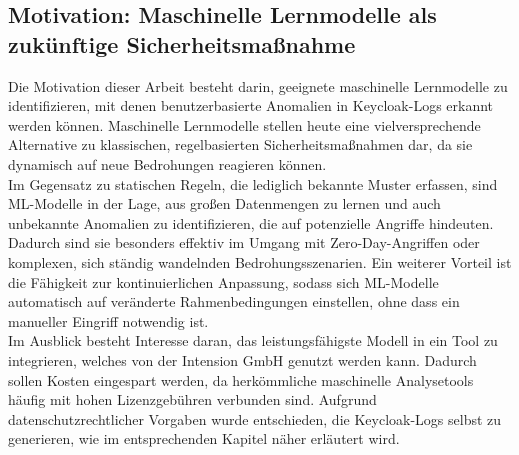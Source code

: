 \documentclass[a4paper,12pt]{article}
\begin{document}
	\subsection{Motivation: Maschinelle Lernmodelle als zukünftige Sicherheitsmaßnahme}
	Die Motivation dieser Arbeit besteht darin, geeignete maschinelle Lernmodelle zu identifizieren, mit denen benutzerbasierte Anomalien in Keycloak-Logs erkannt werden können. Maschinelle Lernmodelle stellen heute eine vielversprechende Alternative zu klassischen, regelbasierten Sicherheitsmaßnahmen dar, da sie dynamisch auf neue Bedrohungen reagieren können.
	\\[0.5em]
	Im Gegensatz zu statischen Regeln, die lediglich bekannte Muster erfassen, sind ML-Modelle in der Lage, aus großen Datenmengen zu lernen und auch unbekannte Anomalien zu identifizieren, die auf potenzielle Angriffe hindeuten. Dadurch sind sie besonders effektiv im Umgang mit Zero-Day-Angriffen oder komplexen, sich ständig wandelnden Bedrohungsszenarien. Ein weiterer Vorteil ist die Fähigkeit zur kontinuierlichen Anpassung, sodass sich ML-Modelle automatisch auf veränderte Rahmenbedingungen einstellen, ohne dass ein manueller Eingriff notwendig ist.
	\\[0.5em]
	Im Ausblick besteht Interesse daran, das leistungsfähigste Modell in ein Tool zu integrieren, welches von der Intension GmbH genutzt werden kann. Dadurch sollen Kosten eingespart werden, da herkömmliche maschinelle Analysetools häufig mit hohen Lizenzgebühren verbunden sind. Aufgrund datenschutzrechtlicher Vorgaben wurde entschieden, die Keycloak-Logs selbst zu generieren, wie im entsprechenden Kapitel näher erläutert wird.
	
\end{document}
